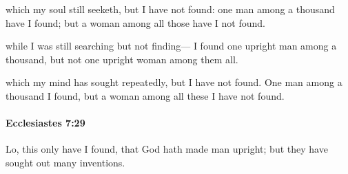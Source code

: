 			\begin{versebox}
					\item[BHS] 
					\item[LXX] 
					\item[ASV] which my soul still seeketh, but I have not found: one man among a thousand have I found; but a woman among all those have I not found.
					\item[NIV] while I was still searching but not finding— I found one upright man among a thousand, but not one upright woman among them all.
					\item[NRSV] which my mind has sought repeatedly, but I have not found. One man among a thousand I found, but a woman among all these I have not found.
			\end{versebox}

		\paragraph{Ecclesiastes 7:29} %
			\label{ECCLESIASTES-7-29}

			Lo, this only have I found, that God hath made man upright; but they have sought out many inventions.

